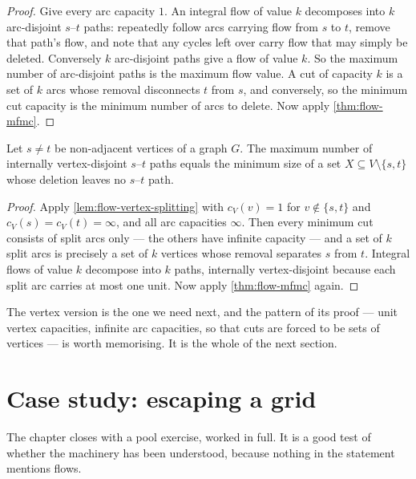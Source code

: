 \begin{proof}
Give every arc capacity $1$. An integral flow of value $k$ decomposes into $k$
arc-disjoint $s$--$t$ paths: repeatedly follow arcs carrying flow from $s$ to
$t$, remove that path's flow, and note that any cycles left over carry flow
that may simply be deleted. Conversely $k$ arc-disjoint paths give a flow of
value $k$. So the maximum number of arc-disjoint paths is the maximum flow
value. A cut of capacity $k$ is a set of $k$ arcs whose removal disconnects
$t$ from $s$, and conversely, so the minimum cut capacity is the minimum number
of arcs to delete. Now apply \cref{thm:flow-mfmc}.
\end{proof}

\begin{theorem}\label{thm:flow-menger-vertex}
Let $s \ne t$ be non-adjacent vertices of a graph $G$. The maximum number of
internally vertex-disjoint $s$--$t$ paths equals the minimum size of a set
$X \subseteq V \setminus \{s,t\}$ whose deletion leaves no $s$--$t$ path.
\end{theorem}

\begin{proof}
Apply \cref{lem:flow-vertex-splitting} with $c_V(v) = 1$ for
$v \notin \{s,t\}$ and $c_V(s) = c_V(t) = \infty$, and all arc capacities
$\infty$. Then every minimum cut consists of split arcs only --- the others
have infinite capacity --- and a set of $k$ split arcs is precisely a set of
$k$ vertices whose removal separates $s$ from $t$. Integral flows of value $k$
decompose into $k$ paths, internally vertex-disjoint because each split arc
carries at most one unit. Now apply \cref{thm:flow-mfmc} again.
\end{proof}

The vertex version is the one we need next, and the pattern of its proof ---
unit vertex capacities, infinite arc capacities, so that cuts are forced to be
sets of vertices --- is worth memorising. It is the whole of the next section.

\section{Case study: escaping a grid}
\label{sec:flow-grid-escape}

The chapter closes with a pool exercise, worked in full. It is a good test of
whether the machinery has been understood, because nothing in the statement
mentions flows.

